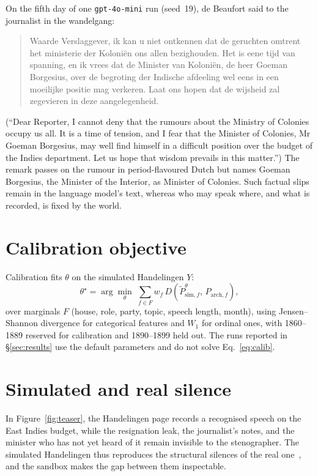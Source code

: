 \documentclass[sigconf,review,anonymous]{acmart}
\begin{document}
On the fifth day of one
\texttt{gpt-4o-mini} run (seed~19), de Beaufort said to the journalist in
the wandelgang:
\begin{quote}\small
Waarde Verslaggever, ik kan u niet ontkennen dat de geruchten omtrent het
ministerie der Koloniën ons allen bezighouden. Het is eene tijd van
spanning, en ik vrees dat de Minister van Koloniën, de heer Goeman
Borgesius, over de begroting der Indische afdeeling wel eens in een
moeilijke positie mag verkeren. Laat ons hopen dat de wijsheid zal
zegevieren in deze aangelegenheid.
\end{quote}
(``Dear Reporter, I cannot deny that the rumours about the Ministry of
Colonies occupy us all. It is a time of tension, and I fear that the
Minister of Colonies, Mr Goeman Borgesius, may well find himself in a
difficult position over the budget of the Indies department. Let us hope
that wisdom prevails in this matter.'') The remark passes on the rumour in
period-flavoured Dutch but names Goeman Borgesius, the Minister of the
Interior, as Minister of Colonies. Such factual slips remain in the
language model's text, whereas who may speak where, and what is recorded,
is fixed by the world.



\section{Calibration objective}
\label{app:calib}
Calibration fits $\theta$ on the simulated Handelingen $Y$:
\begin{equation}
\theta^\star=\arg\min_{\theta}\;\sum_{f\in F} w_f\,
D\!\left(\tilde P^{\theta}_{\text{sim},f},\,P_{\text{arch},f}\right),
\label{eq:calib}
\end{equation}
over marginals $F$ (house, role, party, topic, speech length, month),
using Jensen--Shannon divergence for categorical features and $W_1$ for
ordinal ones, with 1860--1889 reserved for calibration and 1890--1899
held out. The runs reported in \S\ref{sec:results} use the default
parameters and do not solve Eq.~\eqref{eq:calib}.

\section{Simulated and real silence}
\label{app:silence}
In Figure~\ref{fig:teaser}, the
Handelingen page records a recognised speech on the East Indies budget,
while the resignation leak, the journalist's notes, and the minister who
has not yet heard of it remain invisible to the stenographer. The
simulated Handelingen thus reproduces the structural silences of the real
one~\cite{trouillot1995silencing}, and the sandbox makes the gap between
them inspectable.
\end{document}
